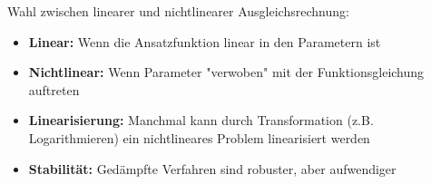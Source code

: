 \begin{KR}{Wahl zwischen linearer und nichtlinearer Ausgleichsrechnung:}
\begin{itemize}
    \item \textbf{Linear:} Wenn die Ansatzfunktion linear in den Parametern ist
    \item \textbf{Nichtlinear:} Wenn Parameter "verwoben" mit der Funktionsgleichung auftreten
    \item \textbf{Linearisierung:} Manchmal kann durch Transformation (z.B. Logarithmieren) ein nichtlineares Problem linearisiert werden
    \item \textbf{Stabilität:} Gedämpfte Verfahren sind robuster, aber aufwendiger
\end{itemize}
\end{KR}


